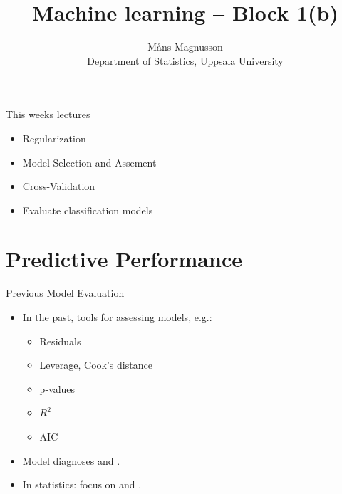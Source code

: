 \documentclass[10pt]{beamer}
\title[]{{\color{black}Machine learning -- Block 1(b)}}
\author[]{M{\aa}ns Magnusson\\Department of Statistics, Uppsala University}
\date{\currentsemester}
\begin{document}
\frame{\titlepage
}



\begin{frame}{This weeks lectures}
\begin{itemize}
\item Regularization
\item Model Selection and Assement
\item Cross-Validation
\item Evaluate classification models
\end{itemize}
\end{frame}




\section{Predictive Performance}
\frame{\sectionpage}

\begin{frame}{Previous Model Evaluation}
\begin{itemize}
\item In the past, tools for assessing models, e.g.:
\begin{itemize}
\item Residuals
\item Leverage, Cook's distance
\item p-values
\item $R^2$
\item AIC
\end{itemize}
\item Model diagnoses and .
\item In statistics: focus on  and .
\end{itemize}
\end{frame}
\end{document}

